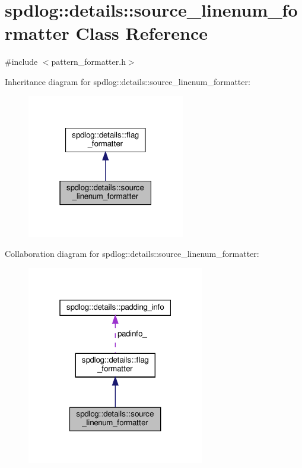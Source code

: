 \hypertarget{classspdlog_1_1details_1_1source__linenum__formatter}{}\section{spdlog\+:\+:details\+:\+:source\+\_\+linenum\+\_\+formatter Class Reference}
\label{classspdlog_1_1details_1_1source__linenum__formatter}


{\ttfamily \#include $<$pattern\+\_\+formatter.\+h$>$}



Inheritance diagram for spdlog\+:\+:details\+:\+:source\+\_\+linenum\+\_\+formatter\+:
\nopagebreak
\begin{figure}[H]
\begin{center}
\leavevmode
\includegraphics[width=195pt]{classspdlog_1_1details_1_1source__linenum__formatter__inherit__graph}
\end{center}
\end{figure}


Collaboration diagram for spdlog\+:\+:details\+:\+:source\+\_\+linenum\+\_\+formatter\+:
\nopagebreak
\begin{figure}[H]
\begin{center}
\leavevmode
\includegraphics[width=220pt]{classspdlog_1_1details_1_1source__linenum__formatter__coll__graph}
\end{center}
\end{figure}
